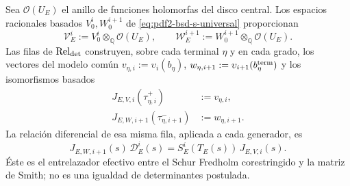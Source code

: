Sea $\mathcal O(U_E)$ el anillo de funciones holomorfas del disco central.
Los espacios racionales basados $V_0^i,W_0^{i+1}$ de
\eqref{eq:pdf2-bsd-s-universal} proporcionan
\begin{equation}\label{eq:pdf2-bsd-dominios-analiticos}
 \mathscr V_E^i:=V_0^i\otimes_{\mathbb Q}\mathcal O(U_E),
 \qquad
 \mathscr W_E^{i+1}:=W_0^{i+1}\otimes_{\mathbb Q}\mathcal O(U_E).
\end{equation}
Las filas de $\operatorname{Rel}_{\rm det}$ construyen, sobre cada terminal
$\eta$ y en cada grado, los vectores del modelo común
$v_{\eta,i}:=\upsilon_i(b_\eta)$,
$w_{\eta,i+1}:=\upsilon_{i+1}(b_\eta^{\rm term})$ y los isomorfismos basados
\begin{equation}\label{eq:pdf2-bsd-jvw-generadores}
 \begin{aligned}
  J_{E,V,i}(\tau_{\eta,i}^+)&:=v_{\eta,i},\\
  J_{E,W,i+1}(\tau_{\eta,i+1}^-)&:=w_{\eta,i+1}.
 \end{aligned}
\end{equation}
La relación diferencial de esa misma fila, aplicada a cada generador, es
\begin{equation}\label{eq:pdf2-bsd-entrelazamiento-analitico-smith}
 \boxed{
 J_{E,W,i+1}(s)\,\mathscr D_E^i(s)
 =S_E^i(T_E(s))\,J_{E,V,i}(s).}
\end{equation}
Éste es el entrelazador efectivo entre el Schur Fredholm corestringido y la
matriz de Smith; no es una igualdad de determinantes postulada.

